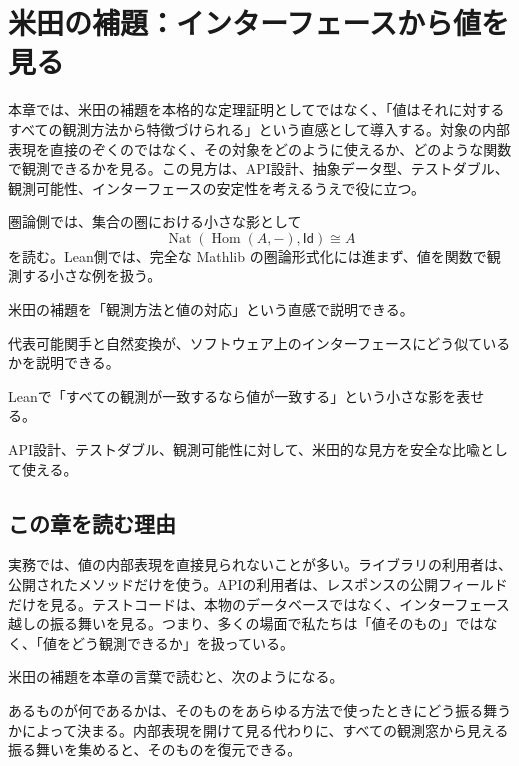 \chapter{米田の補題：インターフェースから値を見る}
\label{chap:yoneda-interface}

\begin{chapterabstract}
本章では、米田の補題を本格的な定理証明としてではなく、「値はそれに対するすべての観測方法から特徴づけられる」という直感として導入する。対象の内部表現を直接のぞくのではなく、その対象をどのように使えるか、どのような関数で観測できるかを見る。この見方は、API設計、抽象データ型、テストダブル、観測可能性、インターフェースの安定性を考えるうえで役に立つ。

圏論側では、集合の圏における小さな影として
\[
  \operatorname{Nat}(\operatorname{Hom}(A,-), \mathsf{Id}) \cong A
\]
を読む。Lean側では、完全な Mathlib の圏論形式化には進まず、値を関数で観測する小さな例を扱う。
\end{chapterabstract}

\begin{learninggoals}
\item 米田の補題を「観測方法と値の対応」という直感で説明できる。
\item 代表可能関手と自然変換が、ソフトウェア上のインターフェースにどう似ているかを説明できる。
\item Leanで「すべての観測が一致するなら値が一致する」という小さな影を表せる。
\item API設計、テストダブル、観測可能性に対して、米田的な見方を安全な比喩として使える。
\end{learninggoals}

\section{この章を読む理由}

実務では、値の内部表現を直接見られないことが多い。ライブラリの利用者は、公開されたメソッドだけを使う。APIの利用者は、レスポンスの公開フィールドだけを見る。テストコードは、本物のデータベースではなく、インターフェース越しの振る舞いを見る。つまり、多くの場面で私たちは「値そのもの」ではなく、「値をどう観測できるか」を扱っている。

\begin{intuitionbox}
米田の補題を本章の言葉で読むと、次のようになる。

あるものが何であるかは、そのものをあらゆる方法で使ったときにどう振る舞うかによって決まる。内部表現を開けて見る代わりに、すべての観測窓から見える振る舞いを集めると、そのものを復元できる。
\end{intuitionbox}

